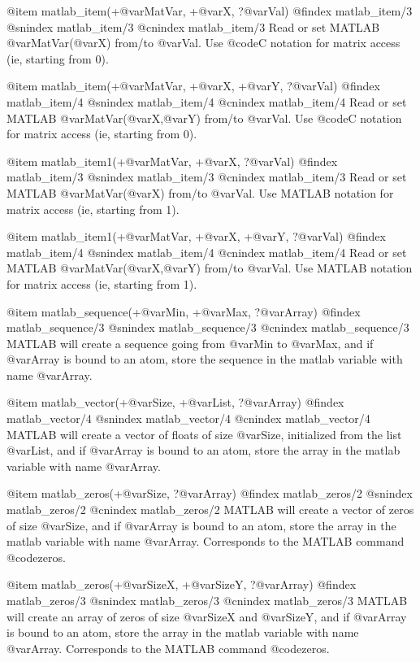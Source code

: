 {{{{{{{{{@item matlab_item(+@var{MatVar}, +@var{X}, ?@var{Val})
@findex matlab_item/3
@snindex matlab_item/3
@cnindex matlab_item/3
Read or set MATLAB @var{MatVar}(@var{X}) from/to @var{Val}. Use
@code{C} notation for matrix access (ie, starting from 0).

@item matlab_item(+@var{MatVar}, +@var{X}, +@var{Y}, ?@var{Val})
@findex matlab_item/4
@snindex matlab_item/4
@cnindex matlab_item/4
Read or set MATLAB @var{MatVar}(@var{X},@var{Y}) from/to @var{Val}. Use
@code{C} notation for matrix access (ie, starting from 0).

@item matlab_item1(+@var{MatVar}, +@var{X}, ?@var{Val})
@findex matlab_item/3
@snindex matlab_item/3
@cnindex matlab_item/3
Read or set MATLAB @var{MatVar}(@var{X}) from/to @var{Val}. Use
MATLAB notation for matrix access (ie, starting from 1).

@item matlab_item1(+@var{MatVar}, +@var{X}, +@var{Y}, ?@var{Val})
@findex matlab_item/4
@snindex matlab_item/4
@cnindex matlab_item/4
Read or set MATLAB @var{MatVar}(@var{X},@var{Y}) from/to @var{Val}. Use
MATLAB notation for matrix access (ie, starting from 1).

@item matlab_sequence(+@var{Min}, +@var{Max}, ?@var{Array})
@findex matlab_sequence/3
@snindex matlab_sequence/3
@cnindex matlab_sequence/3
MATLAB will create a sequence going from @var{Min} to @var{Max}, and
if @var{Array} is bound to an atom, store the sequence in the matlab
variable with name @var{Array}.

@item matlab_vector(+@var{Size}, +@var{List}, ?@var{Array})
@findex matlab_vector/4
@snindex matlab_vector/4
@cnindex matlab_vector/4
MATLAB will create a vector of floats of size @var{Size}, initialized
from the list @var{List}, and if @var{Array} is bound to an atom,
store the array in the matlab variable with name @var{Array}.

@item matlab_zeros(+@var{Size}, ?@var{Array})
@findex matlab_zeros/2
@snindex matlab_zeros/2
@cnindex matlab_zeros/2
MATLAB will create a vector of zeros of size @var{Size}, and if
@var{Array} is bound to an atom, store the array in the matlab
variable with name @var{Array}. Corresponds to the MATLAB command
@code{zeros}.

@item matlab_zeros(+@var{SizeX}, +@var{SizeY}, ?@var{Array})
@findex matlab_zeros/3
@snindex matlab_zeros/3
@cnindex matlab_zeros/3
MATLAB will create an array of zeros of size @var{SizeX} and
@var{SizeY}, and if @var{Array} is bound to an atom, store the array
in the matlab variable with name @var{Array}.  Corresponds to the
MATLAB command @code{zeros}.


}}}}}}}}}
